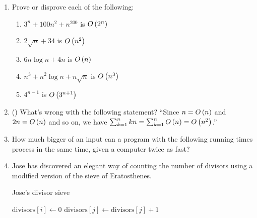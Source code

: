 \begin{exercises}
\begin{enumerate}
    \item[\challenge] Prove or disprove each of the following:
    \begin{enumerate}
        \item $3^n + 100n^2 + n^{200}$ is $O\left(2^n \right)$
        \item $2\sqrt{n} + 34$ is $O\left(n^2 \right)$
        \item $6n \log{n} + 4n$ is $O\left(n \right)$
        \item $n^3 + n^2 \log{n} + n \sqrt{n}$ is $O\left(n^3 \right)$
        \item $4^{n-1}$ is $O\left(3^{n+1} \right)$
    \end{enumerate}
    
    \item[\challenge] (\cite{graham_concrete_1994}) What's wrong with the following statement? ``Since $n = O\left(n \right)$ and $2n = O\left(n \right)$ and so on, we have $\sum_{k=1}^n kn = \sum_{k=1}^n O\left(n \right) = O\left(n^2 \right)$.''
    
    \item How much bigger of an input can a program with the following running times process in the same time, given a computer twice as fast?
    
    \noindent

    \item [\challenge] Jose has discovered an elegant way of counting the number of divisors using a modified version of the sieve of Eratosthenes.
    
    \begin{algorithm}[H]
        \caption{Jose's divisor sieve}
        \begin{algorithmic}[1]
                \State $\mathrm{divisors}[i] \gets 0$
            \EndFor
                    \State $\mathrm{divisors}[j] \gets \mathrm{divisors}[j] + 1$
                \EndFor
            \EndFor
            \EndFunction
        \end{algorithmic}
    \end{algorithm}
    

\end{enumerate}
\end{exercises}
